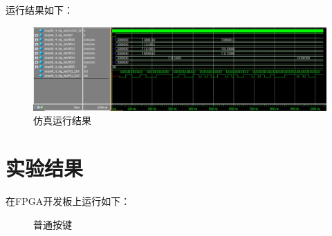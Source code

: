 \documentclass[12pt,a4paper,UTF8]{article}
\begin{document}
运行结果如下：
\begin{figure}[H]
  \centering
  \includegraphics[width=1\textwidth]{sim.JPG}
  \caption{仿真运行结果}
  \label{sim}
\end{figure}

\section{实验结果}
在FPGA开发板上运行如下：
\begin{figure}[H]
  \centering
  \caption{普通按键}
  \label{fpga_normal}
\end{figure}
\end{document}
